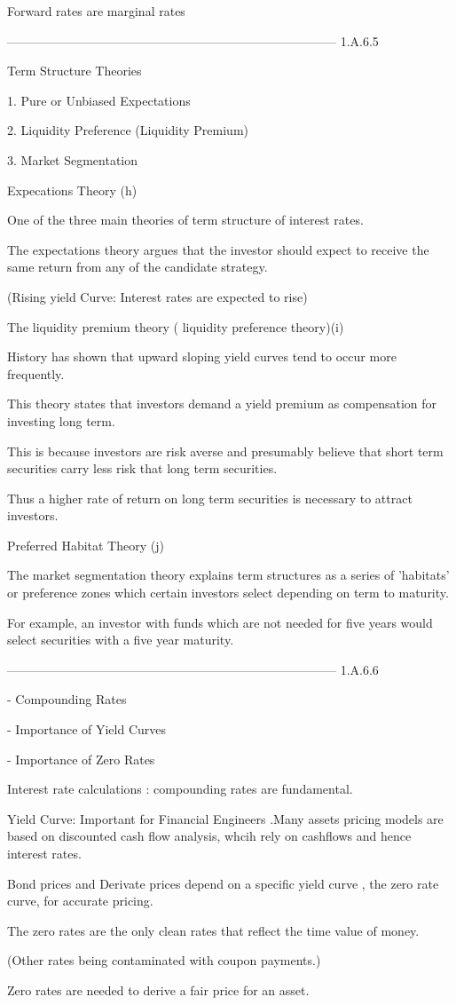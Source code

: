 Forward rates are marginal rates




--------------------------------------------------------------------------------
1.A.6.5


Term Structure Theories


1. Pure or Unbiased Expectations

2. Liquidity Preference (Liquidity Premium)

3. Market Segmentation


Expecations Theory (h)

One of the three main theories of term structure of interest rates.


The expectations theory argues that the investor should expect to receive the same return from any of the candidate strategy.


(Rising yield Curve: Interest rates are expected to rise)


The liquidity premium theory ( liquidity preference theory)(i)


History has shown that upward sloping yield curves tend to occur more frequently.


This theory states that investors demand a yield premium as compensation for investing long term.

This is because investors are risk averse and presumably believe that short term securities carry less risk that long term securities.

Thus a higher rate of return on long term securities is necessary to attract investors.


Preferred Habitat Theory (j)


The market segmentation theory explains term structures as a series of 'habitats' or preference zones which certain investors select depending on term to maturity.


For example, an investor with funds which are not needed for five years would select securities with a five year maturity.





--------------------------------------------------------------------------------
1.A.6.6


 - Compounding Rates

 - Importance of Yield Curves

 - Importance of Zero Rates


Interest rate calculations : compounding rates are fundamental.


Yield Curve: Important for Financial Engineers .Many assets pricing models are based on discounted cash flow analysis, whcih rely on cashflows and hence interest rates.


Bond prices and Derivate prices depend on a specific yield curve , the zero rate curve, for accurate pricing.


The zero rates are the only clean rates that reflect the time value of money. 

(Other rates being contaminated with coupon payments.)


Zero rates are needed to derive a fair price for an asset.


